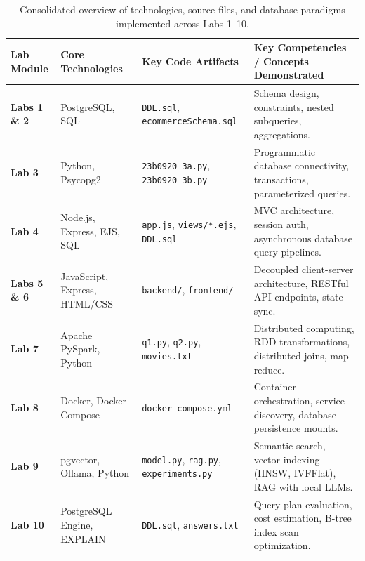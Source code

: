 \documentclass[10pt,a4paper]{article}
\begin{document}
\begin{table}[h!]
\centering
\scriptsize
\renewcommand{\arraystretch}{1.18}
\begin{tabularx}{\textwidth}{lp{3.4cm}p{4.2cm}X}
\toprule
\textbf{Lab Module} & \textbf{Core Technologies} & \textbf{Key Code Artifacts} & \textbf{Key Competencies / Concepts Demonstrated} \\
\midrule
\textbf{Labs 1 \& 2} & PostgreSQL, SQL & \texttt{DDL.sql}, \texttt{ecommerceSchema.sql} & Schema design, constraints, nested subqueries, aggregations. \\
\textbf{Lab 3}       & Python, Psycopg2 & \texttt{23b0920\_3a.py}, \texttt{23b0920\_3b.py} & Programmatic database connectivity, transactions, parameterized queries. \\
\textbf{Lab 4}       & Node.js, Express, EJS, SQL & \texttt{app.js}, \texttt{views/*.ejs}, \texttt{DDL.sql} & MVC architecture, session auth, asynchronous database query pipelines. \\
\textbf{Labs 5 \& 6} & JavaScript, Express, HTML/CSS & \texttt{backend/}, \texttt{frontend/} & Decoupled client-server architecture, RESTful API endpoints, state sync. \\
\textbf{Lab 7}       & Apache PySpark, Python & \texttt{q1.py}, \texttt{q2.py}, \texttt{movies.txt} & Distributed computing, RDD transformations, distributed joins, map-reduce. \\
\textbf{Lab 8}       & Docker, Docker Compose & \texttt{docker-compose.yml} & Container orchestration, service discovery, database persistence mounts. \\
\textbf{Lab 9}       & pgvector, Ollama, Python & \texttt{model.py}, \texttt{rag.py}, \texttt{experiments.py} & Semantic search, vector indexing (HNSW, IVFFlat), RAG with local LLMs. \\
\textbf{Lab 10}      & PostgreSQL Engine, EXPLAIN & \texttt{DDL.sql}, \texttt{answers.txt} & Query plan evaluation, cost estimation, B-tree index scan optimization. \\
\bottomrule
\end{tabularx}
\caption{Consolidated overview of technologies, source files, and database paradigms implemented across Labs 1--10.}
\label{tab:labs_summary}
\end{table}
\end{document}
